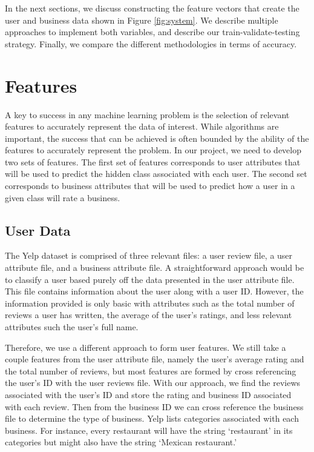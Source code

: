 \documentclass[11pt]{article}
\begin{document}
In the next sections, we discuss constructing the feature vectors that create the user and business data shown in Figure \ref{fig:system}. We describe multiple approaches to implement both variables, and describe our train-validate-testing strategy. Finally, we compare the different methodologies in terms of accuracy.

\section{Features}

A key to success in any machine learning problem is the selection of relevant features to accurately represent the data of interest. While algorithms are important, the success that can be achieved is often bounded by the ability of the features to accurately represent the problem. In our project, we need to develop two sets of features. The first set of features corresponds to user attributes that will be used to predict the hidden class associated with each user. The second set corresponds to business attributes that will be used to predict how a user in a given class will rate a business.

\subsection{User Data}
The Yelp dataset is comprised of three relevant files: a user review file, a user attribute file, and a business attribute file. A straightforward approach would be to classify a user based purely off the data presented in the user attribute file. This file contains information about the user along with a user ID. However, the information provided is only basic with attributes such as the total number of reviews a user has written, the average of the user's ratings, and less relevant attributes such the user's full name.

Therefore, we use a different approach to form user features. We still take a couple features from the user attribute file, namely the user's average rating and the total number of reviews, but most features are formed by cross referencing the user's ID with the user reviews file. With our approach, we find the reviews associated with the user's ID and store the rating and business ID associated with each review. Then from the business ID we can cross reference the business file to determine the type of business.  Yelp lists categories associated with each business. For instance, every restaurant will have the string `restaurant' in its categories but might also have the string `Mexican restaurant.'
\end{document}
